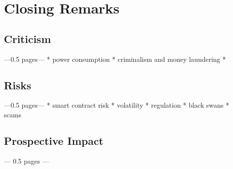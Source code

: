 \chapter{Closing Remarks}
\label{cha:ClosingRemarks}

\section{Criticism}
---0.5 pages---
* power consumption
* criminalism and money laundering
* 

\section{Risks}
---0.5 pages---
* smart contract risk
* volatility
* regulation
* black swans
* scams

\section{Prospective Impact}
--- 0.5 pages ---